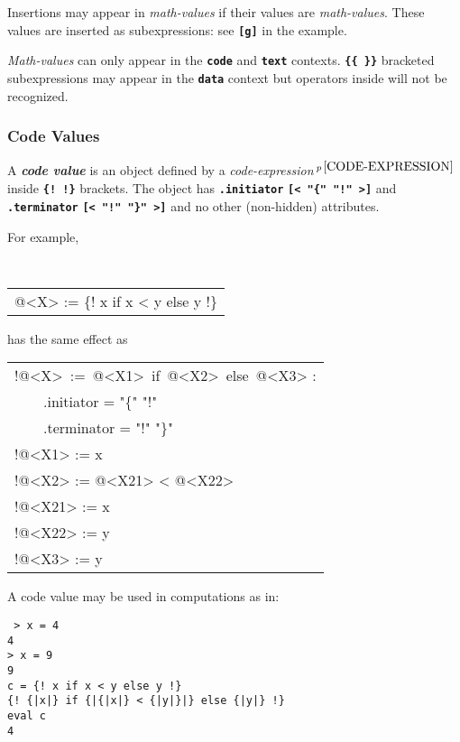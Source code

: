 \documentclass[12pt]{article}
\newcommand{\TT}[1]{{\tt \bfseries #1}}
\newcommand{\key}[1]{{\bf \em #1}\index{#1}}
\newcommand{\pagnote}[1]{$\,^{p\,\pageref{#1}}$}
\newenvironment{indpar}[1][0.3in]%
	{\begin{list}{}%
		     {\setlength{\itemsep}{0in}%
		      \setlength{\topsep}{0in}%
		      \setlength{\parsep}{1ex}%
		      \setlength{\labelwidth}{#1}%
		      \setlength{\leftmargin}{#1}%
		      \addtolength{\leftmargin}{\labelsep}}%
	 \item}%
	{\end{list}}
\begin{document}
Insertions may appear in {\em math-values} if their values are
{\em math-values}.   These values are inserted as subexpressions:
see \TT{[g]} in the example.

{\em Math-values} can only appear in the \TT{code} and \TT{text}
contexts.  \TT{\{\{~\}\}} bracketed subexpressions may appear in the
\TT{data} context but operators inside will not be recognized.

\subsubsection{Code Values}
\label{CODE-VALUES}

A \key{code value} is an object defined by a
{\em code-expression}\pagnote{CODE-EXPRESSION}
inside \TT{\{!~!\}} brackets.  The object has \TT{.initiator}
\TT{[< "\{" "!" >]} and \TT{.terminator}
\TT{[< "!" "\}" >]} and no other (non-hidden) attributes.

For example,
\begin{indpar}
\tt
\begin{tabular}{l}
@<X> := \{! x if x < y else y !\}
\end{tabular}
\end{indpar}
{\rm has the same effect as}
\begin{indpar}
\begin{tabular}{l}
!@<X>~:=~@<X1>~if~@<X2>~else~@<X3> : \\
~~~~.initiator = "\{" "!" \\
~~~~.terminator = "!" "\}" \\
!@<X1> := x \\
!@<X2> := @<X21> < @<X22> \\
!@<X21> := x \\
!@<X22> := y \\
!@<X3> := y \\
\end{tabular}
\end{indpar}

A code value may be used in computations as in:
\begin{indpar}
\tt
> x = 4 \\
4 \\
> x = 9 \\
9 \\
c = \{!~x if x < y else y !\} \\
\{!~\{|x|\} if \{|\{|x|\} < \{|y|\}|\} else \{|y|\} !\} \\
eval c \\
4
\end{indpar}
\end{document}

